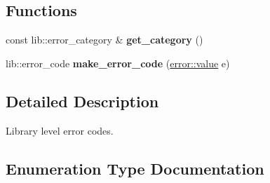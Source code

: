 \subsection*{Functions}
\begin{DoxyCompactItemize}
\item 
const lib\+::error\+\_\+category \& {\bfseries get\+\_\+category} ()\hypertarget{namespacewebsocketpp_1_1error_aff1f9bd9984308ee5631761b89cf706f}{}\label{namespacewebsocketpp_1_1error_aff1f9bd9984308ee5631761b89cf706f}

\item 
lib\+::error\+\_\+code {\bfseries make\+\_\+error\+\_\+code} (\hyperlink{namespacewebsocketpp_1_1error_a0558d884e44e79146ad4947aea63f68d}{error\+::value} e)\hypertarget{namespacewebsocketpp_1_1error_a3344622df8c36e8ae03c59164e7b5e89}{}\label{namespacewebsocketpp_1_1error_a3344622df8c36e8ae03c59164e7b5e89}

\end{DoxyCompactItemize}


\subsection{Detailed Description}
Library level error codes. 

\subsection{Enumeration Type Documentation}
